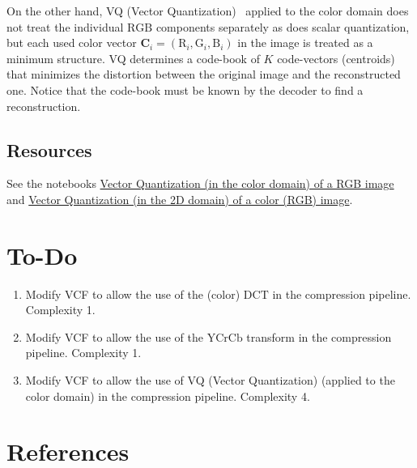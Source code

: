 On the other hand, VQ (Vector
Quantization)~\cite{vruiz__vector_quantization,sayood2017introduction}
applied to the color domain does not treat the individual $\text{RGB}$
components separately as does scalar quantization, but each used color
vector ${\mathbf C}_i = (\text{R}_i, \text{G}_i, \text{B}_i )$ in the
image is treated as a minimum structure. VQ determines a code-book of
$K$ code-vectors (centroids) that minimizes the distortion between the
original image and the reconstructed one. Notice that the code-book
must be known by the decoder to find a reconstruction.

\subsection*{Resources}
See the notebooks
\href{https://github.com/vicente-gonzalez-ruiz/vector_quantization/blob/main/docs/RGB_VQ.ipynb}{Vector
  Quantization (in the color domain) of a RGB image} and
\href{https://github.com/vicente-gonzalez-ruiz/vector_quantization/blob/main/docs/spatial_color_VQ.ipynb}{Vector
  Quantization (in the 2D domain) of a color (RGB) image}.

\section{To-Do}
\begin{enumerate}
\item Modify VCF to allow the use of the (color) $\text{DCT}$ in the
  compression pipeline. Complexity 1.
\item Modify VCF to allow the use of the $\text{YCrCb}$ transform in
  the compression pipeline. Complexity 1.
\item Modify VCF to allow the use of VQ (Vector Quantization) (applied to
  the color domain) in the compression pipeline. Complexity 4.
\end{enumerate}

\section{References}

\renewcommand{\addcontentsline}[3]{}%

